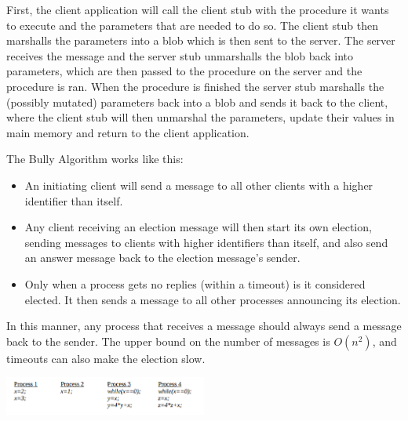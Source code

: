 
First, the client application will call the client stub with the procedure it
wants to execute and the parameters that are needed to do so. The client stub
then marshalls the parameters into a blob which is then sent to the server. The
server receives the message and the server stub unmarshalls the blob back into
parameters, which are then passed to the procedure on the server and the
procedure is ran. When the procedure is finished the server stub marshalls the
(possibly mutated) parameters back into a blob and sends it back to the client,
where the client stub will then unmarshal the parameters, update their values
in main memory and return to the client application.


The Bully Algorithm works like this:

\begin{itemize}
\item An initiating client will send a message to all other clients with a
higher identifier than itself.
\item Any client receiving an election message will then start its own 
election, sending messages to clients with higher identifiers than itself, and 
also send an answer message back to the election message's sender.
\item Only when a process gets no replies (within a timeout) is it considered
elected. It then sends a message to all other processes announcing its election.
\end{itemize}

In this manner, any process that receives a message should always send a message
back to the sender. The upper bound on the number of messages is $O(n^2)$, and
timeouts can also make the election slow.


\begin{center}
  \includegraphics[width=0.5\textwidth]{images/2013-3-d}
\end{center}


